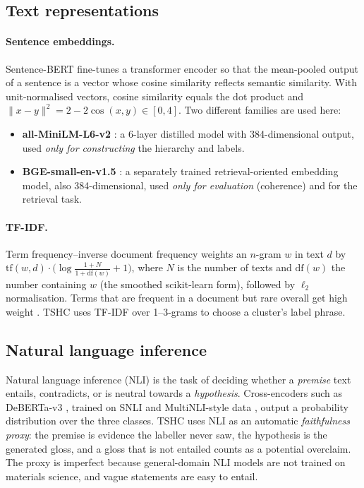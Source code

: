 \documentclass[11pt,a4paper]{article}
\theoremstyle{remark}
\begin{document}
\subsection{Text representations}

\paragraph{Sentence embeddings.}
Sentence-BERT \citep{reimers2019sbert} fine-tunes a transformer encoder so that the
mean-pooled output of a sentence is a vector whose cosine similarity reflects semantic
similarity. With unit-normalised vectors, cosine similarity equals the dot product and
$\|x-y\|^2=2-2\cos(x,y)\in[0,4]$. Two different families are used here:
\begin{itemize}
  \item \textbf{all-MiniLM-L6-v2} \citep{wang2020minilm}: a 6-layer distilled model
        with 384-dimensional output, used \emph{only for constructing} the hierarchy
        and labels.
  \item \textbf{BGE-small-en-v1.5} \citep{xiao2023bge}: a separately trained
        retrieval-oriented embedding model, also 384-dimensional, used
        \emph{only for evaluation} (coherence) and for the retrieval task.
\end{itemize}

\paragraph{TF-IDF.}
Term frequency--inverse document frequency weights an $n$-gram $w$ in text $d$ by
$\mathrm{tf}(w,d)\cdot\big(\log\frac{1+N}{1+\mathrm{df}(w)}+1\big)$, where $N$ is the
number of texts and $\mathrm{df}(w)$ the number containing $w$ (the smoothed
scikit-learn form), followed by $\ell_2$ normalisation. Terms that are frequent in a document but
rare overall get high weight \citep{salton1988}. TSHC uses TF-IDF over 1--3-grams to choose a cluster's
label phrase.

\subsection{Natural language inference}

Natural language inference (NLI) is the task of deciding whether a \emph{premise}
text entails, contradicts, or is neutral towards a \emph{hypothesis}. Cross-encoders
such as DeBERTa-v3 \citep{he2021debertav3}, trained on SNLI and MultiNLI-style data
\citep{bowman2015snli,williams2018mnli},
output a probability distribution over the three classes. TSHC uses NLI as an
automatic \emph{faithfulness proxy}: the premise is evidence the labeller never saw,
the hypothesis is the generated gloss, and a gloss that is not entailed counts as a
potential overclaim. The proxy is imperfect because general-domain NLI models are not
trained on materials science, and vague statements are easy to entail.
\end{document}
